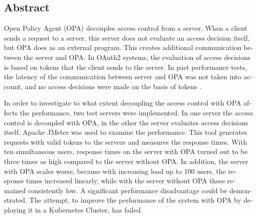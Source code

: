 

\begin{otherlanguage}{american}
	\chapter*{Abstract}

	Open Policy Agent (OPA) decouples access control from a server. When a client sends a request to a server, this server does not evaluate an access decision itself, but OPA does as an external program. This creates additional communication between the server and OPA. In OAuth2 systems, the evaluation of access decisions is based on tokens that the client sends to the server. In past performance tests, the latency of the communication between server and OPA was not taken into account, and no access decisions were made on the basis of tokens \citep{opaperformance:2021:07}.\smallskip

	In order to investigate to what extent decoupling the access control with OPA affects the performance, two test servers were implemented. In one server the access control is decoupled with OPA, in the other the server evaluates access decisions itself. Apache JMeter was used to examine the performance. This tool generates requests with valid tokens to the servers and measures the response times. With ten simultaneous users, response times on the server with OPA turned out to be three times as high compared to the server without OPA. In addition, the server with OPA scales worse, because with increasing load up to 100 users, the response times increased linearly, while with the server without OPA these remained consistently low. A significant performance disadvantage could be demonstrated. The attempt, to improve the performance of the system with OPA by deploying it in a Kubernetes Cluster, has failed.


\end{otherlanguage}
